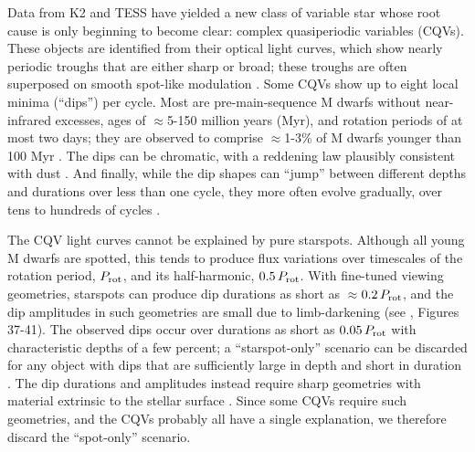 \documentclass[11pt,twocolumn,tighten]{aastex63}
\begin{document}
Data from K2 and TESS have yielded a new class of variable star whose
root cause is only beginning to become clear: complex quasiperiodic
variables (CQVs).  These objects are identified from their optical
light curves, which show nearly periodic troughs that are either sharp
or broad; these troughs are often superposed on smooth spot-like
modulation
\citep{2017AJ....153..152S,2018AJ....155...63S,2019ApJ...876..127Z}.
Some CQVs show up to eight local minima (``dips'') per cycle.  Most
are pre-main-sequence M dwarfs without near-infrared excesses, ages of
$\approx$5-150 million years (Myr), and rotation periods of at most
two days; they are observed to comprise $\approx$1-3\% of M dwarfs
younger than 100 Myr \citep{2016AJ....152..114R,2022AJ....163..144G}.
The dips can be chromatic, with a reddening law plausibly consistent
with dust
\citep{2017PASJ...69L...2O,2020AJ....160...86B,2022AJ....163..144G,2023MNRAS.518.2921K}.
And finally, while the dip shapes can ``jump'' between different
depths and durations over less than one cycle, they more often evolve
gradually, over tens to hundreds of cycles
\citep[e.g.][]{2017AJ....153..152S,2022ApJ...925...75P,2023ApJ...945..114P}.

The CQV light curves cannot be explained by pure starspots.  Although
all young M dwarfs are spotted, this tends to produce flux variations
over timescales of the rotation period, $P_{\rm rot}$,
and its half-harmonic, $0.5\,P_{\rm rot}$.  With fine-tuned
viewing geometries, starspots can produce dip durations as short
as $\approx$$0.2\,P_{\rm rot}$, and the dip amplitudes in such
geometries are small
due to limb-darkening (see \citealt{2017AJ....153..152S},
Figures 37-41).  The observed dips occur over durations as
short as $0.05\,P_{\rm rot}$ with characteristic depths of a few
percent; a ``starspot-only'' scenario can be discarded for any object
with dips that are sufficiently large in depth and short in duration
\citep{2017AJ....153..152S,2021MNRAS.500.1366K}.   The dip durations and
amplitudes instead require
sharp geometries with material extrinsic to the stellar surface
\citep[e.g.][]{2017AJ....153..152S,2022AJ....163..144G}.  Since some CQVs require
such geometries, and the
CQVs probably all have a single explanation, we therefore
discard the ``spot-only'' scenario.
\end{document}

